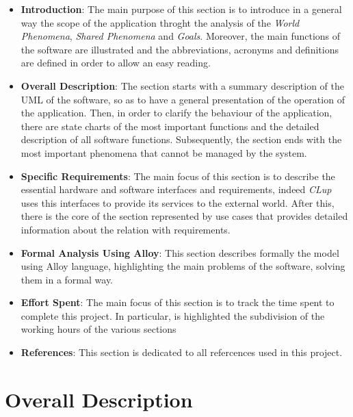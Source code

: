 \documentclass{article}
\begin{document}
	\begin{itemize}
		
		\item {\bfseries Introduction}: The main purpose of this section is to introduce in a general way the scope of the application throght the analysis of the \emph{World Phenomena}, \emph{Shared Phenomena} and \emph{Goals}. Moreover, the main functions of the software are illustrated and the abbreviations, acronyms and definitions are defined in order to allow an easy reading.
		
		\item {\bfseries Overall Description}: The section starts with a summary description of the UML of the software, so as to have a general presentation of the operation of the application. Then, in order to clarify the behaviour of the application, there are state charts of the most important functions and the detailed description of all software functions. Subsequently, the section ends with the most important phenomena that cannot be managed by the system.
		
		\item {\bfseries Specific Requirements}: The main focus of this section is to describe the essential hardware and software interfaces and requirements, indeed \emph{CLup} uses this interfaces to provide its services to the external world. After this, there is the core of the section represented by use cases that provides detailed information about the relation with requirements.
		
		\item {\bfseries Formal Analysis Using Alloy}: This section describes formally the model using Alloy language, highlighting the main problems of the software, solving them in a formal way.
		
		\item {\bfseries Effort Spent}: The main focus of this section is to track the time spent to complete this project. In particular, is highlighted the subdivision of the working hours of the various sections
		
		\item {\bfseries References}: This section is dedicated to all refercences used in this project.
		
	\end{itemize}
	
\newpage	

\section{Overall Description}
\end{document}
